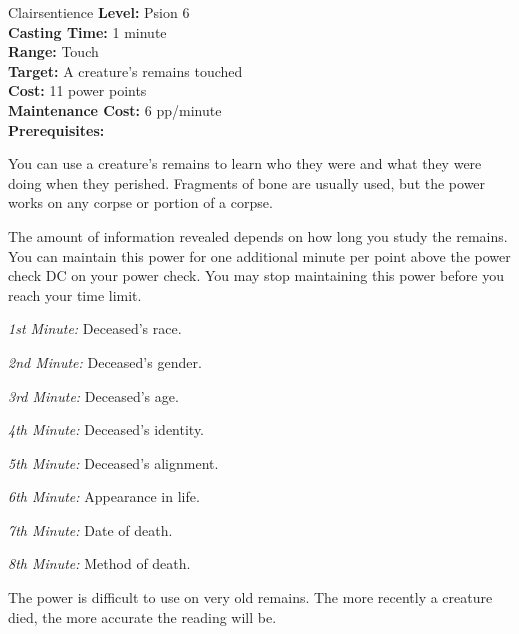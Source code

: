 {Clairsentience}
{
	\textbf{Level:}
	Psion 6\\
	\textbf{Casting Time:}
	1 minute\\
	\textbf{Range:}
	Touch\\
	\textbf{Target:}
	A creature's remains touched\\
	\textbf{Cost:}
	11 power points\\
	\textbf{Maintenance Cost:}
	6 pp/minute\\
	\textbf{Prerequisites:}
	\\
}
{
	You can use a creature's remains to learn who they were and what they were doing when they perished. Fragments of bone are usually used, but the power works on any corpse or portion of a corpse.

	The amount of information revealed depends on how long you study the remains. You can maintain this power for one additional minute per point above the power check DC on your power check. You may stop maintaining this power before you reach your time limit.

	\textit{1st Minute:} Deceased's race.

	\textit{2nd Minute:} Deceased's gender.

	\textit{3rd Minute:} Deceased's age.

	\textit{4th Minute:} Deceased's identity.

	\textit{5th Minute:} Deceased's alignment.

	\textit{6th Minute:} Appearance in life.

	\textit{7th Minute:} Date of death.

	\textit{8th Minute:} Method of death.

	The power is difficult to use on very old remains. The more recently a creature died, the more accurate the reading will be.

}
